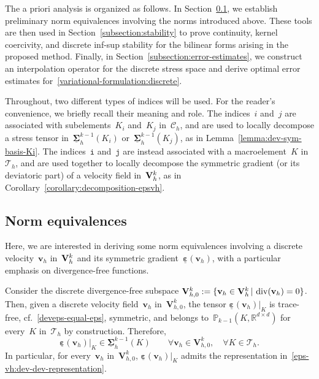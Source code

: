 \documentclass[a4paper,twoside,10pt]{article}
\theoremstyle{plain}
\theoremstyle{remark}
\theoremstyle{definition}
\numberwithin{equation}{section}
\numberwithin{figure}{section}
\newcommand{\Pbbkmo}{\mathbb{P}_{k-1}}
\newcommand{\Ccalh}{\mathcal{C}_h}
\newcommand{\Tauh}{\mathcal{T}_h}
\newcommand{\Rbbdd}{\mathbb{R}^{d\times d}}
\newcommand{\K}{K}
\newcommand{\Sigmah}{\underline{\boldsymbol{\Sigma}}_h}
\newcommand{\Sigmahkmo}{\Sigmah^{k-1}}
\newcommand{\Vh}{{\bf{V}}_h}
\newcommand{\Vhk}{\Vh^k}
\newcommand{\Vhkz}{\Vbf_{h,0}^k}
\newcommand{\vbfh}{\mathbf{v}_h}
\DeclareMathOperator{\dive}{div}
\newcommand{\epsbfun}{\underline{\boldsymbol{\varepsilon}}}
\newcommand{\Ki}{{\K_i}}
\newcommand{\itt}{\mathtt{i}}
\newcommand{\jtt}{\mathtt{j}}
\newcommand{\Vbf}{\mathbf{V}}
\newcommand{\Kj}{\K_j}
\begin{document}
The a priori analysis is organized as follows.
In Section~\ref{subsection:basis-norm-equivalence},
we establish preliminary norm equivalences involving the norms introduced above.
These tools are then used
in Section~\ref{subsection:stability}
to prove continuity,
kernel coercivity,
and discrete inf-sup stability
for the bilinear forms arising in the proposed method.
Finally,
in Section~\ref{subsection:error-estimates},
we construct an interpolation operator for the discrete stress space
and derive optimal error estimates for~\eqref{variational-formulation:discrete}.

Throughout,
two different types of indices will be used.
For the reader's convenience,
we briefly recall their meaning and role.
The indices~$i$ and~$j$ are associated with subelements~$\Ki$ and~$\Kj$ in~$\Ccalh$,
and are used to locally decompose a stress tensor in~$\Sigmahkmo(\Ki)$ or~$\Sigmahkmo(\Kj)$,
as in Lemma~\ref{lemma:dev-sym-basis-Ki}.
The indices~$\itt$ and~$\jtt$ are instead associated with a macroelement~$\K$ in~$\Tauh$,
and are used together to locally decompose the symmetric gradient
(or its deviatoric part)
of a velocity field in~$\Vhk$,
as in Corollary~\ref{corollary:decomposition-epsvh}.

\subsection{Norm equivalences} \label{subsection:basis-norm-equivalence}
Here,
we are interested in deriving some norm equivalences
involving a discrete velocity~$\vbfh$ in~$\Vhk$
and its symmetric gradient~$\epsbfun(\vbfh)$,
with a particular emphasis on divergence-free functions.

Consider the discrete divergence-free subspace
$\Vhkz := \{ \vbfh \in \Vhk \, | \, \dive(\vbfh) = 0 \}$.
Then, given a discrete velocity field~$\vbfh$ in~$\Vhkz$,
the tensor $\epsbfun(\vbfh)|_{\K}$
is trace-free, cf.~\eqref{deveps-equal-eps},
symmetric,
and belongs to~$\Pbbkmo(\K,\Rbbdd)$
for every~$\K$ in~$\Tauh$ by construction.
Therefore,
\begin{equation*}
\epsbfun(\vbfh)|_{\K} \in \Sigmahkmo(\K)
\qquad
\forall \vbfh \in \Vhkz, \quad \forall \K \in \Tauh.
\end{equation*}
In particular,
for every~$\vbfh$ in~$\Vhkz$,
$\epsbfun(\vbfh)|_{\K}$ admits the representation in~\eqref{eps-vh:dev-dev-representation}.
\end{document}
